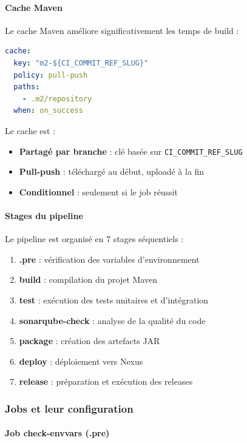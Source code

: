 \paragraph{Cache Maven}

Le cache Maven améliore significativement les temps de build :
\vspace{0.3cm}
\begin{lstlisting}[language=yaml, caption=Configuration du cache]
cache:
  key: "m2-${CI_COMMIT_REF_SLUG}"
  policy: pull-push
  paths:
    - .m2/repository
  when: on_success
\end{lstlisting}

Le cache est :
\begin{itemize}
    \item \textbf{Partagé par branche} : clé basée sur \texttt{CI\_COMMIT\_REF\_SLUG}
    \item \textbf{Pull-push} : téléchargé au début, uploadé à la fin
    \item \textbf{Conditionnel} : seulement si le job réussit
\end{itemize}

\paragraph{Stages du pipeline}

Le pipeline est organisé en 7 stages séquentiels :
\begin{enumerate}
    \item \textbf{.pre} : vérification des variables d'environnement
    \item \textbf{build} : compilation du projet Maven
    \item \textbf{test} : exécution des tests unitaires et d'intégration
    \item \textbf{sonarqube-check} : analyse de la qualité du code
    \item \textbf{package} : création des artefacts JAR
    \item \textbf{deploy} : déploiement vers Nexus
    \item \textbf{release} : préparation et exécution des releases
\end{enumerate}

\subsubsection{Jobs et leur configuration}

\paragraph{Job check-envvars (.pre)}

